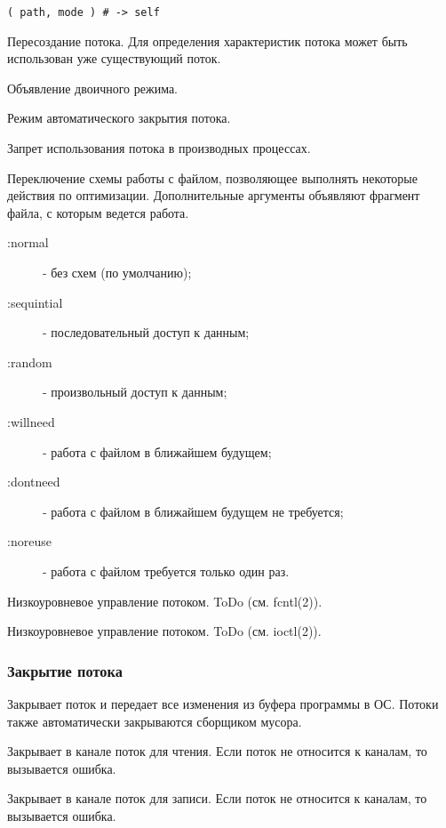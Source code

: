 \begin{methodlist}
  \verb!( path, mode ) # -> self!
  
  Пересоздание потока. Для определения характеристик потока может быть использован уже существующий поток.   

  Объявление двоичного режима.

  Режим автоматического закрытия потока. 

  Запрет использования потока в производных процессах.

  Переключение схемы работы с файлом, позволяющее выполнять некоторые действия по оптимизации. Дополнительные аргументы объявляют фрагмент файла, с которым ведется работа.
  \begin{description}
    \item[:normal] - без схем (по умолчанию);
    \item[:sequintial] - последовательный доступ к данным;
    \item[:random] - произвольный доступ к данным;
    \item[:willneed] - работа с файлом в ближайшем будущем;
    \item[:dontneed] - работа с файлом в ближайшем будущем не требуется;
    \item[:noreuse] - работа с файлом требуется только один раз.
  \end{description}

  Низкоуровневое управление потоком. ToDo (см. fcntl(2)). 
 
  Низкоуровневое управление потоком. ToDo (см. ioctl(2)).
\end{methodlist}

\subsubsection*{Закрытие потока}

\begin{methodlist}
  Закрывает поток и передает все изменения из буфера программы в ОС. Потоки также автоматически закрываются сборщиком мусора. 
 
  Закрывает в канале поток для чтения. Если поток не относится к каналам, то вызывается ошибка. 
 
  Закрывает в канале поток для записи. Если поток не относится к каналам, то вызывается ошибка. 
\end{methodlist} 

